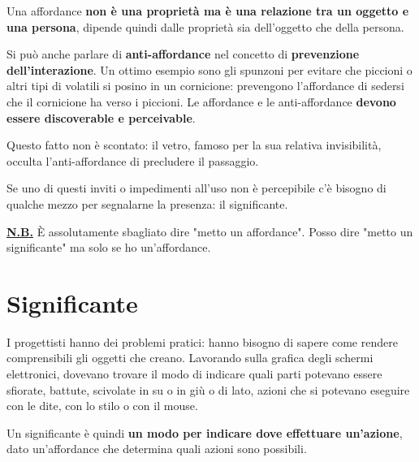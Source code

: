 \documentclass[a4paper,11pt,oneside]{book}
\begin{document}
Una affordance \textbf{non è una proprietà ma è una relazione tra un oggetto e una persona}, dipende quindi dalle proprietà sia dell'oggetto che della persona.

Si può anche parlare di \textbf{anti-affordance} nel concetto di \textbf{prevenzione dell'interazione}. Un ottimo esempio sono gli spunzoni per evitare che piccioni o altri tipi di volatili si posino in un cornicione: prevengono l'affordance di sedersi che il cornicione ha verso i piccioni.
Le affordance e le anti-affordance \textbf{devono essere discoverable e perceivable}.

\pagebreak

Questo fatto non è scontato: il vetro, famoso per la sua relativa invisibilità, occulta l'anti-affordance di precludere il passaggio.

Se uno di questi inviti o impedimenti all'uso non è percepibile c'è bisogno di qualche mezzo per segnalarne la presenza: il significante.

\textbf{\underline{N.B.}} È assolutamente sbagliato dire "metto un affordance". Posso dire "metto un significante" ma solo se ho un'affordance.

\section{Significante}
I progettisti hanno dei problemi pratici: hanno bisogno di sapere come rendere comprensibili gli oggetti che creano. Lavorando sulla grafica degli schermi elettronici, dovevano trovare il modo di indicare quali parti potevano essere sfiorate, battute, scivolate in su o in giù o di lato, azioni che si potevano eseguire con le dite, con lo stilo o con il mouse.

Un significante è quindi \textbf{un modo per indicare dove effettuare un'azione}, dato un'affordance che determina quali azioni sono possibili.
\end{document}
